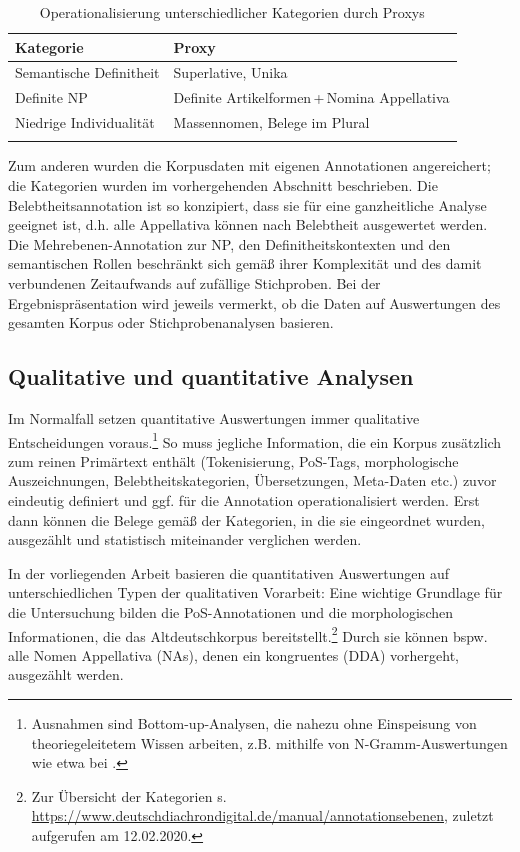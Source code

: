 \begin{table}
\centering
\begin{tabular}{ll}
\lsptoprule
Kategorie     & Proxy            \\ \midrule
Semantische Definitheit & Superlative, Unika            \\
Definite NP             & Definite Artikelformen\,+\,Nomina Appellativa        \\
Niedrige Individualität & Massennomen, Belege im Plural \\ \lspbottomrule
\end{tabular}
\caption{Operationalisierung unterschiedlicher Kategorien durch Proxys\label{tab:proxys}}
\end{table}
 
Zum anderen wurden die Korpusdaten mit eigenen Annotationen angereichert; die Kategorien wurden im vorhergehenden Abschnitt beschrieben. Die Belebtheitsannotation ist so konzipiert, dass sie für eine ganzheitliche Analyse geeignet ist, d.h. alle Appellativa können nach Belebtheit ausgewertet werden. Die Mehrebenen-Annotation zur NP, den Definitheitskontexten und den semantischen Rollen beschränkt sich gemäß ihrer Komplexität und des damit verbundenen Zeitaufwands auf zufällige Stichproben. Bei der Ergebnispräsentation wird jeweils vermerkt, ob die Daten auf Auswertungen des gesamten Korpus oder Stichprobenanalysen basieren. 

\subsection{Qualitative und quantitative Analysen}\label{sec:qual-quant}

Im Normalfall setzen quantitative Auswertungen immer qualitative Entscheidungen voraus.\footnote{Ausnahmen sind Bottom-up-Analysen, die nahezu ohne Einspeisung von theoriegeleitetem Wissen arbeiten, z.B. mithilfe von N-Gramm-Auswertungen wie etwa bei \textcite{Scharloth2012}.} So muss jegliche Information, die ein Korpus zusätzlich zum reinen Primärtext enthält (Tokenisierung, PoS-Tags, morphologische Auszeichnungen, Belebtheitskategorien, Übersetzungen, Meta-Daten etc.) zuvor eindeutig definiert und ggf. für die Annotation operationalisiert werden. Erst dann können die Belege gemäß der Kategorien, in die sie eingeordnet wurden, ausgezählt und statistisch miteinander verglichen werden.   

In der vorliegenden Arbeit basieren die quantitativen Auswertungen auf unterschiedlichen Typen der qualitativen Vorarbeit:
Eine wichtige Grundlage für die Untersuchung bilden die PoS-Annotationen und die morphologischen Informationen, die das Altdeutschkorpus bereitstellt.\footnote{Zur Übersicht der Kategorien s. \url{https://www.deutschdiachrondigital.de/manual/annotationsebenen}, zuletzt aufgerufen am 12.02.2020.} Durch sie können bspw. alle Nomen Appellativa (NAs), denen ein kongruentes  (DDA) vorhergeht, ausgezählt werden.

